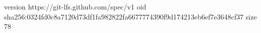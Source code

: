 version https://git-lfs.github.com/spec/v1
oid sha256:0324fd0c8a7120d73df1fa982822fa6677774390f9d174213eb6ef7e3648cf37
size 78
